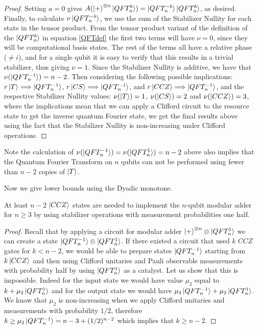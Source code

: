 \documentclass[12pt]{dalthesis}
\begin{document}
\begin{proof}
Setting $a=0$ gives $A(\ket{+}^{\otimes n} \ket{QFT_n^b}) = \ket{QFT_n^{-b}}\ket{QFT_n^b}$, as desired. Finally, to calculate $\nu \ket{QFT_n^{-b}}$, we use the sum of the Stabilizer Nullity for each state in the tensor product. From the tensor product variant of the definition of the $\ket{QFT_n^b}$ in equation \ref{QFTdef} the first two terms will have $\nu = 0$, since they will be computational basis states. The rest of the terms all have a relative phase ($\neq i$), and for a single qubit it is easy to verify that this results in a trivial stabilizer, thus giving $\nu = 1$. Since the Stabilizer Nullity is additive, we have that $\nu(\ket{QFT_n^{-1}}) = n-2$. Then considering the following possible implications: $r\ket{T} \Longrightarrow \ket{QFT_n^{-1}}$, $r\ket{CS} \Longrightarrow \ket{QFT_n^{-1}}$, and $r\ket{CCZ} \Longrightarrow \ket{QFT_n^{-1}}$, and the respective Stabilizer Nullity values: $\nu (\ket{T}) = 1$, $\nu (\ket{CS}) = 2$ and $\nu (\ket{CCZ}) = 3$, where the implications mean that we can apply a Clifford circuit to the resource state to get the inverse quantum Fourier state, we get the final results above using the fact that the Stabilizer Nullity is non-increasing under Clifford operations.
\end{proof}

Note the calculation of $\nu(\ket{QFT_n^{-1}}) = \nu(\ket{QFT_n^{1}}) = n-2$ above also implies that the Quantum Fourier Transform on $n$ qubits can not be performed using fewer than $n-2$ copies of $\ket{T}$.

Now we give lower bounds using the Dyadic monotone.


\begin{lemma}
At least $n-2$ $\ket{CCZ}$ states are needed to implement the $n$-qubit modular adder for $n \geq 3$ by using stabilizer operations with measurement probabilities one half.
\end{lemma}
\begin{proof}
Recall that by applying a circuit for modular adder $\ket{+}^{\otimes n} \otimes \ket{QFT_n^1}$ we can create a state $\ket{QFT_n^{-1}} \otimes \ket{QFT_n^1}$. If there existed a circuit that used $k$ $CCZ$ gates for $k < n-2$, we would be able to prepare states $\ket{QFT_n^{-1}}$ starting from $k \ket{CCZ}$ and then using Clifford unitaries and Pauli observable measurements with probability half by using $\ket{QFT_n^1}$ as a catalyst. Let us show that this is impossible. Indeed for the input state we would have value $\mu_2$ equal to $k + \mu_2 \ket{QFT_n^1}$ and for the output state we would have $\mu_2 \ket{QFT_n^{-1}} + \mu_2 \ket{QFT_n^1}$. We know that $\mu_2$ is non-increasing when we apply Clifford unitaries and measurements with probability $1/2$, therefore $k \geq \mu_2 \ket{QFT_n^{-1}} = n - 3 +(1/2)^{n-2}$ which implies that $k \geq n-2$.
\end{proof}
\end{document}
